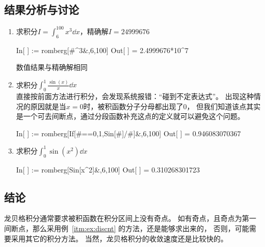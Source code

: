 \documentclass{hitgsrep}
\begin{document}
\subsection{结果分析与讨论}

\begin{enumerate}
    \item 求积分$I=\int_6^{100}x^3\dd{x}$，精确解$I=24999676$
    \begin{wlinput}
    In[ ] := romberg[#^3&,{6,100}]
    Out[ ] = 2.4999676*10^7
    \end{wlinput}
    数值结果与精确解相同
    \item\label{itm:ex:discnt} 求积分$\int_0^1\frac{\sin(x)}{x}\dd{x}$\\
    直接按前面方法进行积分，会发现系统报错：“碰到不定表达式”。
    出现这种情况的原因就是当$x=0$时，被积函数分子分母都出现了$0$，
    但我们知道该点其实是一个可去间断点，通过分段函数补充这点的定义就可以避免这个问题。
    \begin{wlinput}
    In[ ] := romberg[If[#==0,1,Sin[#]/#]&,{6,100}]
    Out[ ] = 0.946083070367
    \end{wlinput}
    \item 求积分$\int_0^1\sin(x^2)\dd{x}$
    \begin{wlinput}
    In[ ] := romberg[Sin[x^2]&,{6,100}]
    Out[ ] = 0.310268301723
    \end{wlinput}
\end{enumerate}

\subsection{结论}

龙贝格积分通常要求被积函数在积分区间上没有奇点。
如有奇点，且奇点为第一间断点，那么采用例~\ref{itm:ex:discnt} 的方法，还是能够求出来的，
否则，可能需要采用其它的积分方法。
当然，龙贝格积分的收敛速度还是比较快的。
\end{document}
